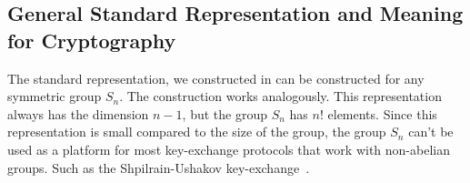 \subsection{General Standard Representation and Meaning for Cryptography}

The standard representation, we constructed in  can be constructed for any symmetric group $S_n$.
The construction works analogously.
This representation always has the dimension $n - 1$, but the group $S_n$ has $n!$ elements.
Since this representation is small compared to the size of the group, the group $S_n$ can't be used as a platform for most key-exchange protocols that work with non-abelian groups.
Such as the Shpilrain-Ushakov key-exchange~\cite{khovanov2022monoidal}.
